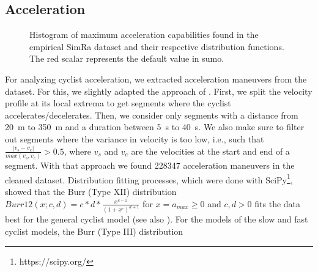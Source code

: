 \subsection{Acceleration}
\label{subsec:acceleration_preprocessing}
\begin{figure}
    \centering
    \hfill
    \caption{%
        Histogram of maximum acceleration capabilities found in the empirical SimRa dataset and their respective distribution functions.
        The red scalar represents the default value in \ac{sumo}.
    }%
    \label{fig:analysis_max_acceleration_dist_fit}
\end{figure}

For analyzing cyclist acceleration, we extracted acceleration maneuvers from the dataset.
For this, we slightly adapted the approach of \cite{ma2016modeling}.
First, we split the velocity profile at its local extrema to get segments where the cyclist accelerates/decelerates.
Then, we consider only segments with a distance from \SI{20}{\metre} to \SI{350}{\metre} and a duration between \SI{5}{\second} to \SI{40}{\second}.
We also make sure to filter out segments where the variance in velocity is too low, i.e., such that $ \frac{|v_{s} - v_{e}|}{max(v_{s},v_{e})} > 0.5 $, where $v_{s}$ and $v_{e}$ are the velocities at the start and end of a segment.
With that approach we found \num{228347} acceleration maneuvers in the cleaned dataset.
Distribution fitting processes, which were done with SciPy\footnote{https://scipy.org/}, showed that the Burr (Type XII) distribution~\cite{burr1942cumulative} $Burr12(x; c,d) = c*d*\frac{x^{c-1}}{(1+x^c)^{d+1}}$ for $x = a_{max} \geq 0$ and $c,d > 0$  fits the data best for the general cyclist model (see also ).
For the models of the slow and fast cyclist models, the Burr (Type III) distribution~\cite{burr1942cumulative} 


